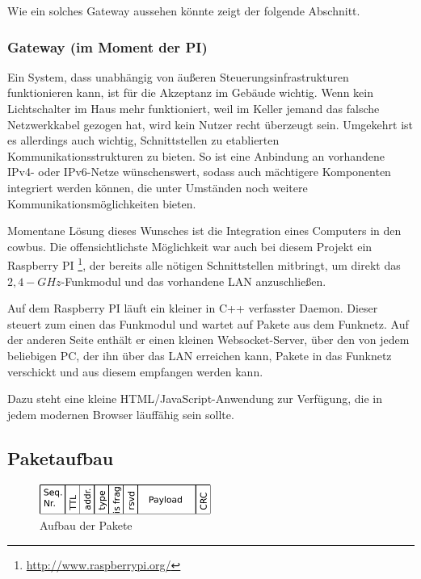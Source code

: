 \documentclass{IEEEtran}
\begin{document}
            Wie ein solches Gateway aussehen könnte zeigt der folgende Abschnitt.

        \subsubsection{Gateway (im Moment der PI)}
            Ein System, dass unabhängig von äußeren Steuerungsinfrastrukturen
            funktionieren kann, ist für die Akzeptanz im Gebäude wichtig.
            Wenn kein Lichtschalter im Haus mehr funktioniert, weil
            im Keller jemand das falsche Netzwerkkabel gezogen hat,
            wird kein Nutzer recht überzeugt sein.
            Umgekehrt ist es allerdings auch wichtig, Schnittstellen zu
            etablierten Kommunikationsstrukturen zu bieten.
            So ist eine Anbindung an vorhandene IPv4- oder IPv6-Netze
            wünschenswert, sodass auch mächtigere Komponenten integriert werden
            können, die unter Umständen noch weitere Kommunikationsmöglichkeiten
            bieten.

            Momentane Lösung dieses Wunsches ist die Integration eines Computers
            in den cowbus. Die offensichtlichste Möglichkeit war auch bei diesem
            Projekt ein Raspberry PI \footnote{\url{http://www.raspberrypi.org/}},
            der bereits alle nötigen Schnittstellen mitbringt, um direkt das
            $2,4-GHz$-Funkmodul und das vorhandene \ac{LAN} anzuschließen.

            Auf dem Raspberry PI läuft ein kleiner in C++ verfasster Daemon.
            Dieser steuert zum einen das Funkmodul und wartet auf Pakete aus
            dem Funknetz.
            Auf der anderen Seite enthält er einen kleinen Websocket-Server,
            über den von jedem beliebigen PC, der ihn über das \ac{LAN}
            erreichen kann, Pakete in das Funknetz verschickt und aus diesem
            empfangen werden kann.

            Dazu steht eine kleine HTML/JavaScript-Anwendung zur Verfügung,
            die in jedem modernen Browser läuffähig sein sollte.


    
    \subsection{Paketaufbau}
            \begin{figure}
            \centering
            \includegraphics[width=0.5\textwidth]{img/paket}
            \caption{Aufbau der Pakete}
            \label{fig:paket}
        \end{figure}
\end{document}
